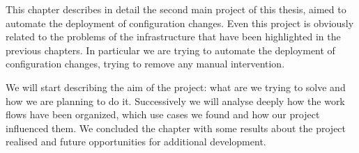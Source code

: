 
This chapter describes in detail the second main project of this thesis,
aimed to automate the deployment of configuration changes. Even this
project is obviously related to the problems of the infrastructure that
have been highlighted in the previous chapters. In particular we are
trying to automate the deployment of configuration changes, trying to
remove any manual intervention.

We will start describing the aim of the project: what are we trying to
solve and how we are planning to do it. Successively we will analyse
deeply how the work flows have been organized, which use cases we found
and how our project influenced them. We concluded the chapter with some
results about the project realised and future opportunities for additional
development.

